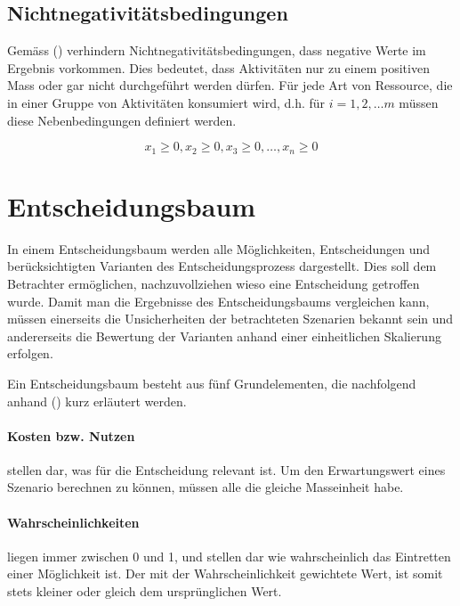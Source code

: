 \subsection*{Nichtnegativitätsbedingungen}

Gemäss (\cite{Adey2019}) verhindern Nichtnegativitätsbedingungen, dass negative Werte im Ergebnis vorkommen. Dies bedeutet, dass Aktivitäten nur zu einem positiven Mass oder gar nicht durchgeführt werden dürfen. Für jede Art von Ressource, die in einer Gruppe von Aktivitäten konsumiert wird, d.h. für $i=1,2,\dots m$ müssen diese Nebenbedingungen definiert werden. 

\begin{equation}
	x_{1} \geq 0, x_{2} \geq 0, x_{3} \geq 0, \dots, x_{n} \geq 0
\end{equation}

\newpage

\section{Entscheidungsbaum}
\label{sec:Decisiontree}

In einem Entscheidungsbaum werden alle Möglichkeiten, Entscheidungen und berücksichtigten Varianten des Entscheidungsprozess dargestellt. Dies soll dem Betrachter ermöglichen, nachzuvollziehen wieso eine Entscheidung getroffen wurde. Damit man die Ergebnisse des Entscheidungsbaums vergleichen kann, müssen einerseits die Unsicherheiten der betrachteten Szenarien bekannt sein und andererseits die Bewertung der Varianten anhand einer einheitlichen Skalierung erfolgen.

Ein Entscheidungsbaum besteht aus fünf Grundelementen, die nachfolgend anhand (\cite{Adey2019}) kurz erläutert werden.

\paragraph{Kosten bzw. Nutzen} stellen dar, was für die Entscheidung relevant ist. Um den Erwartungswert eines Szenario berechnen zu können, müssen alle die gleiche Masseinheit habe.

\paragraph{Wahrscheinlichkeiten} liegen immer zwischen 0 und 1, und stellen dar wie wahrscheinlich das Eintretten einer Möglichkeit ist. Der mit der Wahrscheinlichkeit gewichtete Wert, ist somit stets kleiner oder gleich dem ursprünglichen Wert. 

